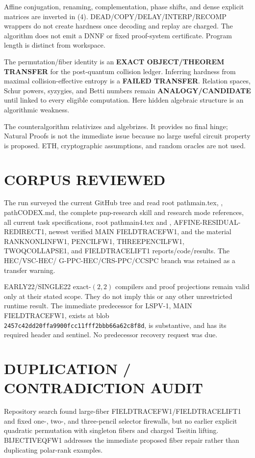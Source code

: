 \documentclass[11pt]{article}
\begin{document}
Affine conjugation, renaming, complementation, phase shifts, and dense explicit
matrices are inverted in (4).  DEAD/COPY/DELAY/INTERP/RECOMP wrappers do not
create hardness once decoding and replay are charged.  The algorithm does not
emit a DNNF or fixed proof-system certificate.  Program length is distinct
from workspace.

The permutation/fiber identity is an \textbf{EXACT OBJECT/THEOREM TRANSFER}
for the post-quantum collision ledger.  Inferring hardness from maximal
collision-effective entropy is a \textbf{FAILED TRANSFER}.  Relation spaces,
Schur powers, syzygies, and Betti numbers remain
\textbf{ANALOGY/CANDIDATE} until linked to every eligible computation.  Here
hidden algebraic structure is an algorithmic weakness.

The counteralgorithm relativizes and algebrizes.  It provides no final hinge;
Natural Proofs is not the immediate issue because no large useful circuit
property is proposed.  ETH, cryptographic assumptions, and random oracles are
not used.

\section{CORPUS REVIEWED}
The run surveyed the current GitHub tree and read root path{main.tex},
, path{CODEX.md}, the complete pnp-research skill and research
mode references, all current task specifications, root path{main4.tex} and
, AFFINE-RESIDUAL-REDIRECT1, newest verified MAIN
FIELDTRACEFW1, and the material RANKNONLINFW1, PENCILFW1, THREEPENCILFW1,
TWOQCOLLAPSE1, and FIELDTRACELIFT1 reports/code/results.  The HEC/VSC-HEC/
G-PPC-HEC/CRS-PPC/CCSPC branch was retained as a transfer warning.

EARLY22/SINGLE22 exact-$(2,2)$ compilers and proof projections remain valid
only at their stated scope.  They do not imply this or any other unrestricted
runtime result.  The immediate predecessor for LSPV-1, MAIN FIELDTRACEFW1,
exists at blob
\texttt{2457c42dd20ffa9900fcc11fff2bbb66a62c8f8d}, is substantive, and has its
required header and sentinel.  No predecessor recovery request was due.

\section{DUPLICATION / CONTRADICTION AUDIT}
Repository search found large-fiber FIELDTRACEFW1/FIELDTRACELIFT1 and fixed
one-, two-, and three-pencil selector firewalls, but no earlier explicit
quadratic permutation with singleton fibers and charged Tseitin lifting.
BIJECTIVEQFW1 addresses the immediate proposed fiber repair rather than
duplicating polar-rank examples.
\end{document}
